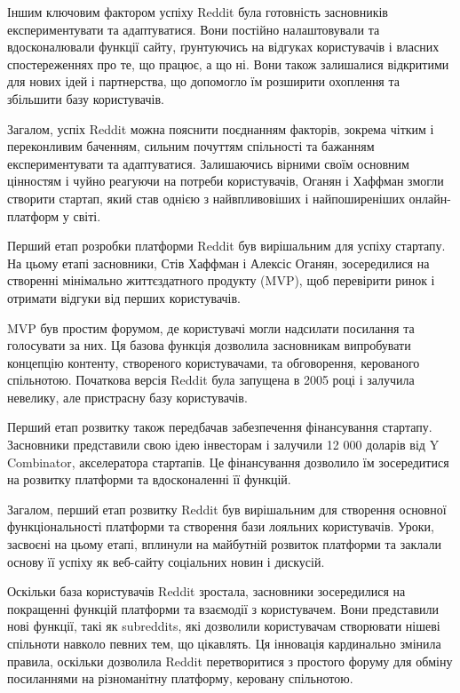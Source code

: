 \documentclass[oneside,14pt]{extarticle}
\begin{document}
Іншим ключовим фактором успіху Reddit була готовність засновників експериментувати та адаптуватися. Вони постійно налаштовували та вдосконалювали функції сайту, ґрунтуючись на відгуках користувачів і власних спостереженнях про те, що працює, а що ні. Вони також залишалися відкритими для нових ідей і партнерства, що допомогло їм розширити охоплення та збільшити базу користувачів.

Загалом, успіх Reddit можна пояснити поєднанням факторів, зокрема чітким і переконливим баченням, сильним почуттям спільності та бажанням експериментувати та адаптуватися. Залишаючись вірними своїм основним цінностям і чуйно реагуючи на потреби користувачів, Оганян і Хаффман змогли створити стартап, який став однією з найвпливовіших і найпоширеніших онлайн-платформ у світі.

Перший етап розробки платформи Reddit був вирішальним для успіху стартапу. На цьому етапі засновники, Стів Хаффман і Алексіс Оганян, зосередилися на створенні мінімально життєздатного продукту (MVP), щоб перевірити ринок і отримати відгуки від перших користувачів.

MVP був простим форумом, де користувачі могли надсилати посилання та голосувати за них. Ця базова функція дозволила засновникам випробувати концепцію контенту, створеного користувачами, та обговорення, керованого спільнотою. Початкова версія Reddit була запущена в 2005 році і залучила невелику, але пристрасну базу користувачів.

Перший етап розвитку також передбачав забезпечення фінансування стартапу. Засновники представили свою ідею інвесторам і залучили 12 000 доларів від Y Combinator, акселератора стартапів. Це фінансування дозволило їм зосередитися на розвитку платформи та вдосконаленні її функцій.

Загалом, перший етап розвитку Reddit був вирішальним для створення основної функціональності платформи та створення бази лояльних користувачів. Уроки, засвоєні на цьому етапі, вплинули на майбутній розвиток платформи та заклали основу її успіху як веб-сайту соціальних новин і дискусій.

Оскільки база користувачів Reddit зростала, засновники зосередилися на покращенні функцій платформи та взаємодії з користувачем. Вони представили нові функції, такі як subreddits, які дозволили користувачам створювати нішеві спільноти навколо певних тем, що цікавлять. Ця інновація кардинально змінила правила, оскільки дозволила Reddit перетворитися з простого форуму для обміну посиланнями на різноманітну платформу, керовану спільнотою.
\end{document}
